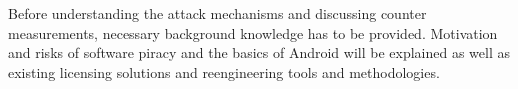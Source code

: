 Before understanding the attack mechanisms and discussing counter measurements, necessary background knowledge has to be provided.
Motivation and risks of software piracy and the basics of Android will be explained as well as existing licensing solutions and reengineering tools and methodologies.
